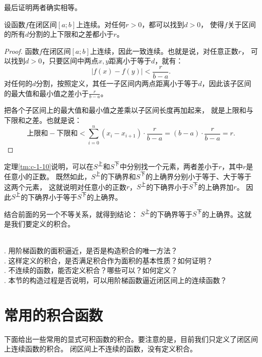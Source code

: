 \documentclass[12pt,UTF8]{ctexbook}
\begin{document}
\begin{appendix}
最后证明两者确实相等。

\begin{tm}\label{tm:c-1-10}
    设函数$f$在闭区间$[a; b]$上连续。对任何$r>0$，都可以找到$d>0$，
    使得$f$关于区间的所有$d$\dash 分割的上下限和之差都小于$r$。
\end{tm}

\begin{proof}
    函数$f$在闭区间$[a; b]$上连续，因此一致连续。也就是说，对任意正数$r$，
    可以找到$d>0$，只要区间中两点$x,y$距离小于等于$d$，就有：
    $$ |f(x) - f(y)| < \frac{r}{b - a}. $$
    对任何的$d$\dash 分割，按照定义，其任一子区间内两点距离小于等于$d$，因此该子区间的最大值和最小值之差小于$\frac{r}{b - a}$。
    
    把各个子区间上的最大值和最小值之差乘以子区间长度再加起来，
    就是上限和与下限和之差。也就是说：
    $$ \mbox{上限和} - \mbox{下限和} < \sum_{i=0}^n (x_i - x_{i+1}) \cdot \frac{r}{b - a} = (b - a) \cdot \frac{r}{b - a} = r.$$
\end{proof}

定理\ref{tm:c-1-10}说明，可以在$S^{\text{上}}$和$S^{\text{下}}$中分别找一个元素，两者差小于$r$，其中$r$是任意小的正数。
既然如此，$S^{\text{上}}$的下确界和$S^{\text{下}}$的上确界分别小于等于、大于等于这两个元素，
这就说明对任意小的正数$r$，$S^{\text{上}}$的下确界小于$S^{\text{下}}$的上确界加$r$。
因此$S^{\text{上}}$的下确界小于等于$S^{\text{下}}$的上确界。

结合前面的另一个不等关系，就得到结论：
$S^{\text{上}}$的下确界等于$S^{\text{下}}$的上确界。这就是我们要定义的积合。

\begin{sk}
    \mbox{} \\
    . 用阶梯函数的面积逼近，是否是构造积合的唯一方法？ \\
    . 这样定义的积合，是否满足积合作为面积的基本性质？如何证明？\\
    . 不连续的函数，能否定义积合？哪些可以？如何定义？\\
    . 本节的构造过程是否说明，可以用阶梯函数逼近闭区间上的连续函数？
\end{sk}

\section{常用的积合函数}

下面给出一些常用的显式可积函数的积合。要注意的是，目前我们只定义了闭区间上连续函数的积合。
闭区间上不连续的函数，没有定义积合。


\end{appendix}
\end{document}
